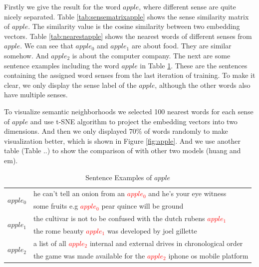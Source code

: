 Firstly we give the result for the word $apple$, where different sense are quite nicely separated. Table \ref{tab:sensematrixapple} shows the sense similarity matrix of $apple$. The similarity value is the cosine similarity between two embedding vectors. Table \ref{tab:nearestapple} shows the nearest words of different senses from $apple$. We can see that $apple_0$ and $apple_1$ are about food. They are similar somehow. And $apple_2$ is about the computer company. The next are some sentence examples including the word $apple$ in Table \ref{tab:sentenceapple}. These are the sentences containing the assigned word senses from the last iteration of training. To make it clear, we only display the sense label of the $apple$, although the other words also have multiple senses.

To visualize semantic neighborhoods we selected 100 nearest words for each sense of $apple$ and use t-SNE algorithm \citep{MaatenHinton2008} to project the embedding vectors into two dimensions. And then we only displayed $70\%$ of words randomly to make visualization better, which is shown in Figure \ref{fig:apple}. And we use another table (Table ..) to show the comparison of with other two models (huang and em).
 


\begin{table}[tb]

\caption{Sentence Examples of $apple$} \label{tab:sentenceapple} 
\begin{center} 
\begin{tabular}{|l|l|}
\hline
\multirow{2}{*}{$apple_0$} 
&he can't tell an onion from an \textcolor{red}{$apple_0$} and he's your eye witness\\
&some fruits e.g \textcolor{red}{$apple_0$} pear quince will be ground\\
\hline
\multirow{2}{*}{$apple_1$} 
&the cultivar is not to be confused with the dutch rubens \textcolor{red}{$apple_1$}\\
&the rome beauty \textcolor{red}{$apple_1$} was developed by joel gillette \\
\hline
\multirow{2}{*}{$apple_2$} 
&a list of all \textcolor{red}{$apple_2$} internal and external drives in chronological order\\
&the game was made available for the \textcolor{red}{$apple_2$} iphone os mobile platform\\
\hline
\end{tabular} 
\end{center}
\end{table}


